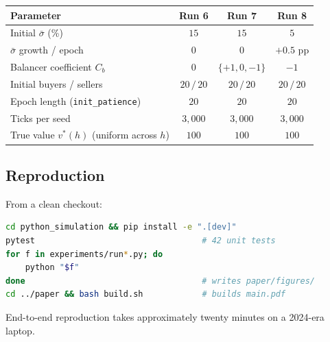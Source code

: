 \begin{table}[h]
\centering
\small
\begin{tabular}{l c c c}
\toprule
\textbf{Parameter} & \textbf{Run 6} & \textbf{Run 7} & \textbf{Run 8} \\
\midrule
Initial $\bar{\sigma}$ (\%)    & $15$  & $15$  & $5$ \\
$\bar{\sigma}$ growth / epoch  & $0$   & $0$   & $+0.5$ pp \\
Balancer coefficient $C_{b}$   & $0$   & $\{+1, 0, -1\}$ & $-1$ \\
Initial buyers / sellers       & $20\,/\,20$ & $20\,/\,20$ & $20\,/\,20$ \\
Epoch length (\texttt{init\_patience}) & $20$ & $20$ & $20$ \\
Ticks per seed                 & $3{,}000$ & $3{,}000$ & $3{,}000$ \\
True value $v^{*}(h)$ (uniform across $h$) & $100$ & $100$ & $100$ \\
\bottomrule
\end{tabular}
\end{table}

\subsection{Reproduction}

From a clean checkout:
\begin{lstlisting}[language=bash]
cd python_simulation && pip install -e ".[dev]"
pytest                                  # 42 unit tests
for f in experiments/run*.py; do
    python "$f"
done                                    # writes paper/figures/
cd ../paper && bash build.sh            # builds main.pdf
\end{lstlisting}

End-to-end reproduction takes approximately twenty minutes on a
2024-era laptop.
